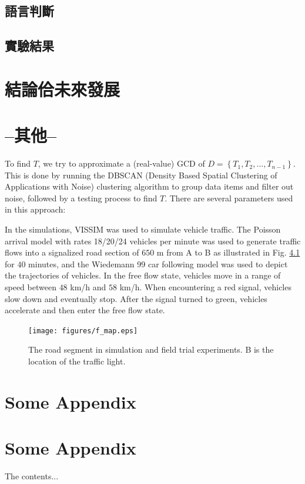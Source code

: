 \documentclass[final,oneside,onecolumn,12pt,a4paper]{book}%
\begin{document}
\section{語言判斷}
\label{節：語言判斷}

\section{實驗結果}
\label{節：實驗結果}


\chapter{結論佮未來發展}
\label{章：結論佮未來發展}

\chapter{--其他--}
To find $T$, we try to approximate a (real-value) GCD of $D=\left\{
T_{1},T_{2},...,T_{n-1}\right\}  $. This is done by running the DBSCAN
(Density Based Spatial Clustering of Applications with Noise) clustering
algorithm \cite{Ester1996DBSCAN} to group data items and filter out noise,
followed by a testing process to find $T$. There are several parameters used
in this approach:

In the simulations, VISSIM \cite{Mosseri2004VISSIM} was used to simulate
vehicle traffic. The Poisson arrival model with rates 18/20/24 vehicles per
minute was used to generate traffic flows into a signalized road section of
$650$ m from A to B as illustrated in Fig. \ref{fig:f_map} for $40$ minutes,
and the Wiedemann 99 car following model \cite{Mosseri2004VISSIM} was used to
depict the trajectories of vehicles. In the free flow state, vehicles move in
a range of speed between $48$ km/h and $58$ km/h. When encountering a red
signal, vehicles slow down and eventually stop. After the signal turned to
green, vehicles accelerate and then enter the free flow state.
\begin{figure}[pth]
\centerline{\texttt{[image: figures/f\_map.eps]}} \hfill\caption{The road segment in simulation and field
trial experiments. B is the location of the traffic light.}%
\label{fig:f_map}%
\end{figure}




\begin{appendices}
\chapter{Some Appendix}
\chapter{Some Appendix}
The contents...
\end{appendices}
\end{document}
